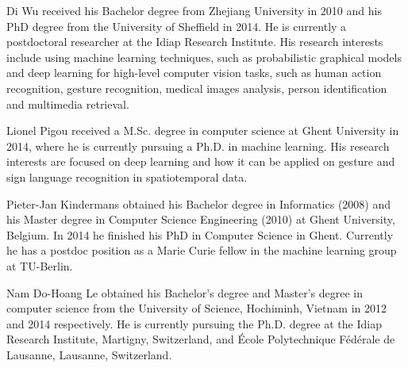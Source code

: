 


\begin{IEEEbiography}{Di Wu}
received his Bachelor degree from Zhejiang University in 2010 and his PhD degree from the University of Sheffield in 2014. He is currently a postdoctoral researcher at the Idiap Research Institute. His research interests include using machine learning techniques, such as probabilistic graphical models and deep learning for high-level computer vision tasks, such as human action recognition, gesture recognition, medical images analysis, person identification and multimedia retrieval.
\end{IEEEbiography}

\begin{IEEEbiography}{Lionel Pigou}
received a M.Sc. degree in computer science at Ghent University in 2014, where he is currently pursuing a Ph.D. in machine learning. His research interests are focused on deep learning and how it can be applied on gesture and sign language recognition in spatiotemporal data.
\end{IEEEbiography}


\begin{IEEEbiography}{Pieter-Jan Kindermans}
obtained his Bachelor degree in Informatics (2008) and his Master degree in Computer Science Engineering (2010) at Ghent University, Belgium. In 2014 he finished his PhD in Computer Science in Ghent. Currently he has a postdoc position as a Marie Curie fellow in the machine learning group at TU-Berlin.
\end{IEEEbiography}


\begin{IEEEbiography}{Nam Do-Hoang Le}
 obtained his Bachelor's degree and Master's degree in computer science from the University of Science, Hochiminh, Vietnam in 2012 and 2014 respectively. 
He is currently pursuing the Ph.D. degree at the Idiap Research Institute, Martigny, Switzerland, and \'Ecole Polytechnique F\'ed\'erale de Lausanne, Lausanne, Switzerland.
\end{IEEEbiography}


